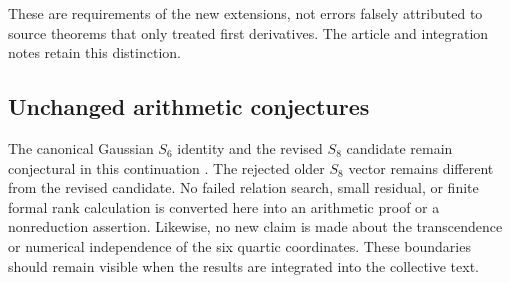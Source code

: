 These are requirements of the new extensions, not errors falsely
attributed to source theorems that only treated first derivatives.
The article and integration notes retain this distinction.

\subsection{Unchanged arithmetic conjectures}

The canonical Gaussian $S_6$ identity and the revised $S_8$ candidate
remain conjectural in this continuation \cite{Manuscript}.  The rejected
older $S_8$ vector remains different from the revised candidate.  No
failed relation search, small residual, or finite formal rank calculation
is converted here into an arithmetic proof or a nonreduction assertion.
Likewise, no new claim is made about the transcendence or numerical
independence of the six quartic coordinates.  These boundaries should
remain visible when the results are integrated into the collective text.

